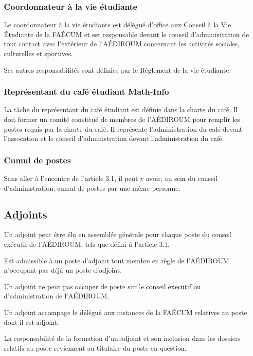 \documentclass[12pt]{article}
\begin{document}
\subsubsection{Coordonnateur à la vie étudiante}

 Le coordonnateur à la vie étudiante est délégué d'office aux Conseil à la Vie Étudiante de la FAÉCUM et est responsable devant le conseil d'administration de tout contact avec l'extérieur de l'AÉDIROUM concernant les activités sociales, culturelles et sportives.


Ses autres responsabilités sont définies par le Règlement de la vie étudiante.


\subsubsection{Représentant du café étudiant Math-Info}

La tâche du représentant du café étudiant est définie dans la charte du café. Il doit former un comité constitué de membres de l'AÉDIROUM pour remplir les postes requis par la charte du café. Il représente l'administration du café devant l'assocation et le conseil d'administration devant l'administration du café.

\subsubsection{Cumul de postes}

Sans aller à l'encontre de l'article 3.1, il peut y avoir, au sein du conseil d'administration, cumul de postes par une même personne.

\subsection{Adjoints}

Un adjoint peut être élu en assemblée générale pour chaque poste du conseil exécutif de l’AÉDIROUM, tels que défini à l’article 3.1. 

Est admissible à un poste d’adjoint tout membre en règle de l’AÉDIROUM n’occupant pas déjà un poste d’adjoint.

Un adjoint ne peut pas occuper de poste sur le conseil executif ou d’administration de l’AÉDIROUM.

Un adjoint accompage le délégué aux instances de la FAÉCUM relatives au poste dont il est adjoint.

La responsabilité de la formation d’un adjoint et son inclusion dans les dossiers relatifs au poste reviennent au titulaire du poste en question.
\end{document}
